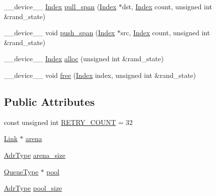 \begin{DoxyCompactItemize}
\item 
\-\_\-\-\_\-device\-\_\-\-\_\- \hyperlink{structutil_1_1MemPool_abad76ce984ee05501d88426b5641e5c2}{Index} \hyperlink{structutil_1_1MemPool_a82623b73dbd8c82d11ed5035f944c0f4}{pull\-\_\-span} (\hyperlink{structutil_1_1MemPool_abad76ce984ee05501d88426b5641e5c2}{Index} $\ast$dst, \hyperlink{structutil_1_1MemPool_abad76ce984ee05501d88426b5641e5c2}{Index} count, unsigned int \&rand\-\_\-state)
\item 
\-\_\-\-\_\-device\-\_\-\-\_\- void \hyperlink{structutil_1_1MemPool_a0f13618544a8289192bdf02513e9683a}{push\-\_\-span} (\hyperlink{structutil_1_1MemPool_abad76ce984ee05501d88426b5641e5c2}{Index} $\ast$src, \hyperlink{structutil_1_1MemPool_abad76ce984ee05501d88426b5641e5c2}{Index} count, unsigned int \&rand\-\_\-state)
\item 
\-\_\-\-\_\-device\-\_\-\-\_\- \hyperlink{structutil_1_1MemPool_abad76ce984ee05501d88426b5641e5c2}{Index} \hyperlink{structutil_1_1MemPool_a46f9f8acdab8fb7f4dbb2826341568e5}{alloc} (unsigned int \&rand\-\_\-state)
\item 
\-\_\-\-\_\-device\-\_\-\-\_\- void \hyperlink{structutil_1_1MemPool_a8443f419cab01072b858a9e159a73a3d}{free} (\hyperlink{structutil_1_1MemPool_abad76ce984ee05501d88426b5641e5c2}{Index} index, unsigned int \&rand\-\_\-state)
\end{DoxyCompactItemize}
\subsection*{Public Attributes}
\begin{DoxyCompactItemize}
\item 
const unsigned int \hyperlink{structutil_1_1MemPool_abcd02966289aa30c1a42639c143dfbcb}{R\-E\-T\-R\-Y\-\_\-\-C\-O\-U\-N\-T} = 32
\item 
\hyperlink{unionutil_1_1MemPool_1_1Link}{Link} $\ast$ \hyperlink{structutil_1_1MemPool_ad57ae2b34c9a37bfe06c8e4f2391cc79}{arena}
\item 
\hyperlink{structutil_1_1MemPool_ace5e7994507896fbdb4e188e3886e73d}{Adr\-Type} \hyperlink{structutil_1_1MemPool_aed11ede5c4c2ebe38250f8e994778ad0}{arena\-\_\-size}
\item 
\hyperlink{structutil_1_1MemPool_a354adf83f470881d3839a19f9589aad9}{Queue\-Type} $\ast$ \hyperlink{structutil_1_1MemPool_a16d1cdeb28025ec1efd62f495f6e24e7}{pool}
\item 
\hyperlink{structutil_1_1MemPool_ace5e7994507896fbdb4e188e3886e73d}{Adr\-Type} \hyperlink{structutil_1_1MemPool_a963a9317f3e7614a3929cae952235ad2}{pool\-\_\-size}
\end{DoxyCompactItemize}


